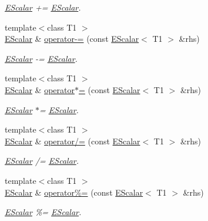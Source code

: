 \begin{DoxyCompactItemize}
\begin{DoxyCompactList}\small\item\em \mbox{\hyperlink{classENSEM_1_1EScalar}{E\+Scalar}} += \mbox{\hyperlink{classENSEM_1_1EScalar}{E\+Scalar}}. \end{DoxyCompactList}\item 
{\footnotesize template$<$class T1 $>$ }\\\mbox{\hyperlink{classENSEM_1_1EScalar}{E\+Scalar}} \& \mbox{\hyperlink{classENSEM_1_1EScalar_a2ed33688ab765d0e4d15b391b3f61f33}{operator-\/=}} (const \mbox{\hyperlink{classENSEM_1_1EScalar}{E\+Scalar}}$<$ T1 $>$ \&rhs)
\begin{DoxyCompactList}\small\item\em \mbox{\hyperlink{classENSEM_1_1EScalar}{E\+Scalar}} -\/= \mbox{\hyperlink{classENSEM_1_1EScalar}{E\+Scalar}}. \end{DoxyCompactList}\item 
{\footnotesize template$<$class T1 $>$ }\\\mbox{\hyperlink{classENSEM_1_1EScalar}{E\+Scalar}} \& \mbox{\hyperlink{classENSEM_1_1EScalar_aa614bef8258a8ea3c2711c4d7d032c1a}{operator$\ast$=}} (const \mbox{\hyperlink{classENSEM_1_1EScalar}{E\+Scalar}}$<$ T1 $>$ \&rhs)
\begin{DoxyCompactList}\small\item\em \mbox{\hyperlink{classENSEM_1_1EScalar}{E\+Scalar}} $\ast$= \mbox{\hyperlink{classENSEM_1_1EScalar}{E\+Scalar}}. \end{DoxyCompactList}\item 
{\footnotesize template$<$class T1 $>$ }\\\mbox{\hyperlink{classENSEM_1_1EScalar}{E\+Scalar}} \& \mbox{\hyperlink{classENSEM_1_1EScalar_a09524cf0f6f5baf9c421d03df58fe8d6}{operator/=}} (const \mbox{\hyperlink{classENSEM_1_1EScalar}{E\+Scalar}}$<$ T1 $>$ \&rhs)
\begin{DoxyCompactList}\small\item\em \mbox{\hyperlink{classENSEM_1_1EScalar}{E\+Scalar}} /= \mbox{\hyperlink{classENSEM_1_1EScalar}{E\+Scalar}}. \end{DoxyCompactList}\item 
{\footnotesize template$<$class T1 $>$ }\\\mbox{\hyperlink{classENSEM_1_1EScalar}{E\+Scalar}} \& \mbox{\hyperlink{classENSEM_1_1EScalar_ab4bd572c2f331fadf6914f406bce991f}{operator\%=}} (const \mbox{\hyperlink{classENSEM_1_1EScalar}{E\+Scalar}}$<$ T1 $>$ \&rhs)
\begin{DoxyCompactList}\small\item\em \mbox{\hyperlink{classENSEM_1_1EScalar}{E\+Scalar}} \%= \mbox{\hyperlink{classENSEM_1_1EScalar}{E\+Scalar}}. \end{DoxyCompactList}\item 

\end{DoxyCompactItemize}
